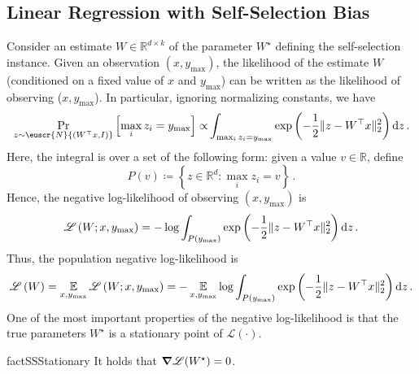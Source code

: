 \documentclass[11pt,letterpaper]{article}
\theoremstyle{plain}
\theoremstyle{definition}
\theoremstyle{remark}
\newcommand{\inbrace}[1]{\ensuremath{\left\{#1\right\}}}
\newcommand{\inparen}[1]{\ensuremath{\left(#1\right)}}
\newcommand{\insquare}[1]{\ensuremath{\left[#1\right]}}
\newcommand{\snorm}[1]{\ensuremath{\ensuremath{\| #1 \|}}}
\newcommand{\R}{\mathbb{R}}
\newcommand{\E}{\operatornamewithlimits{\mathbb{E}}}
\newcommand{\Ex}{\E}
\newcommand{\customcal}[1]{\euscr{#1}}
\newcommand{\cL}{\customcal{L}}
\newcommand{\cN}{\customcal{N}}
\newcommand{\negLL}{\ensuremath{\mathscr{L}}}
\renewcommand{\d}{{\rm d}}
\newcommand{\normal}[2]{\cN{\inparen{#1,#2}}}
\newcommand{\Wstar}{{W^\star}}
\newcommand{\ymax}{y_{\max}}
\renewcommand{\cL}{\negLL}
\begin{document}
{{{    \subsection{Linear Regression with Self-Selection Bias}\label{sec:hessian:SS}
        Consider an estimate $W\in \R^{d\times k}$ of the parameter $W^\star$ defining the self-selection instance.
        Given an observation $(x,\ymax)$, the likelihood of the estimate $W$ (conditioned on a fixed value of $x$ and $\ymax$) can be written as the likelihood of observing ($x,\ymax$).
        In particular,
        {ignoring normalizing constants,
        we have}
        \[
            {\Pr_{z\sim \normal{W^\top x}{I}} \insquare{\max_i z_i = \ymax}
            \propto} 
            \int_{\max_i {z_i} = \ymax} \exp\inparen{-\frac{1}{2}\snorm{z- W^\top x}_2^2} \d z\,.
        \]
        Here, the integral is over a set of the following form:
        given a value $v\in \R$, define
        \[
            P(v)\coloneqq \inbrace{z\in \R^d\colon \max_i z_i = v}\,.
        \]
        Hence, the negative log-likelihood of observing $(x,\ymax)$ is 
        \[
            \cL\inparen{W; x,\ymax} = -\log\int_{P({\ymax})} \exp\inparen{-\frac{1}{2}\snorm{z- W^\top x}_2^2} \d z\,.
        \]
        Thus, the population negative log-likelihood is
        \[
            \cL\inparen{W} 
            = \Ex_{x,\ymax}\cL\inparen{W; x,\ymax} 
            = -\Ex_{x,\ymax}\log\int_{P({\ymax})} \exp\inparen{-\frac{1}{2}\snorm{z- W^\top x}_2^2} \d z\,.
        \]
        One of the most important properties of the negative log-likelihood is that the true parameters $\Wstar$ is a stationary point of $\cL(\cdot)$.
        \begin{restatable}[]{fact}{SSStationary}\label{fact:SS:stationaryPoint}
            It holds that $\grad \cL(W^\star)=0$.    
        \end{restatable}
}}}
\end{document}
